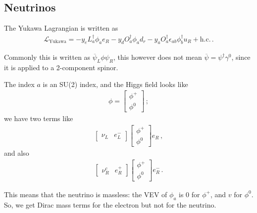 \documentclass[main.tex]{subfiles}
\begin{document}
\subsection{Neutrinos}


The Yukawa Lagrangian is written as 
%
\begin{align}
\mathscr{L}_{\text{Yukawa}}
= - y_{e} L ^\dag_{a} \phi_{a} e_{R}
-y_{d} O ^\dag_{a} \phi_{a} d_{r}
-y_{a} O ^\dag_{a} \epsilon_{ab} \phi ^\dag_{b} u_{R} 
+ \text{h.c.}
\,.
\end{align}

Commonly this is written as \(\overline{\psi}_{L} \phi \psi_{R}\), this however does not mean \(\overline{\psi} = \psi ^\dag \gamma^{0}\), since it is applied to a 2-component spinor. 

The index \(a\) is an SU(2) index, and the Higgs field looks like 
%
\begin{align}
\phi = \left[\begin{array}{c}
\phi^{+} \\ 
\phi^{0}
\end{array}\right]
\,;
\end{align}
%
we have two terms like 
%
\begin{align}
\left[\begin{array}{cc}
\nu_{L} & e^{-}_{L}
\end{array}\right]
\left[\begin{array}{c}
\phi^{+} \\ 
\phi^{0}
\end{array}\right]
e_{R}
\,,
\end{align}
%
and also 
%
\begin{align}
\left[\begin{array}{cc}
\nu_{R}^{c} & e^{+}_{R}
\end{array}\right]
\left[\begin{array}{c}
\phi^{+} \\ 
\phi^{0}
\end{array}\right]
e_{R}^{-}
\,.
\end{align}

This means that the neutrino is massless: the VEV of \(\phi_{a}\) is 0 for \(\phi^{+}\), and \(v\) for \(\phi^{0}\). 
So, we get Dirac mass terms for the electron but not for the neutrino.
\end{document}
